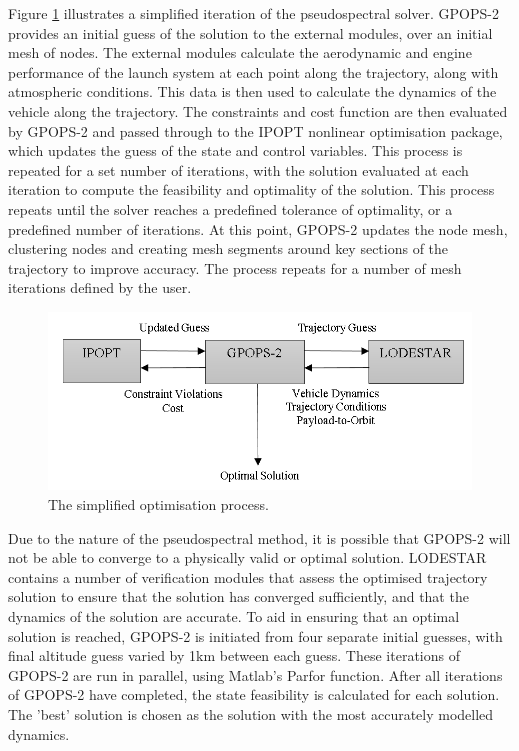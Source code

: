 Figure \ref{fig:FlowChartSmall} illustrates a simplified iteration of the pseudospectral solver. GPOPS-2 provides an initial guess of the solution to the external modules, over an initial mesh of nodes.
The external modules calculate the aerodynamic and engine performance of the launch system at each point along the trajectory, along with atmospheric conditions. This data is then used to calculate the dynamics of the vehicle along the trajectory. The constraints and cost function are then evaluated by GPOPS-2 and passed through to the IPOPT nonlinear optimisation package\cite{Wachter2006}, which updates the guess of the state and control variables. This process is repeated for a set number of iterations, with the solution evaluated at each iteration to compute the feasibility and optimality of the solution. This process repeats until the solver reaches a predefined tolerance of optimality, or a predefined number of iterations. At this point, GPOPS-2 updates the node mesh, clustering nodes and creating mesh segments around key sections of the trajectory to improve accuracy. The process repeats for a number of mesh iterations defined by the user. 
\begin{figure}[ht]
	\centering
	\includegraphics[width=0.75\linewidth]{figures/4_LODESTAR/FlowChartSmall}
	\caption{The simplified optimisation process.}
	\label{fig:FlowChartSmall}
\end{figure}

Due to the nature of the pseudospectral method, it is possible that GPOPS-2 will not be able to converge to a physically valid or optimal solution. 
LODESTAR contains a number of verification modules that assess the optimised trajectory solution to ensure that the solution has converged sufficiently, and that the dynamics of the solution are accurate. 
To aid in ensuring that an optimal solution is reached, GPOPS-2 is initiated from four separate initial guesses, with final altitude guess varied by 1km between each guess. These iterations of GPOPS-2 are run in parallel, using Matlab's \textsf{Parfor} function. After all iterations of GPOPS-2 have completed, the state feasibility is calculated for each solution. The 'best' solution is chosen as the solution with the most accurately modelled dynamics. 



